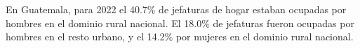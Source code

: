 En Guatemala, para 2022 el 40.7\% de jefaturas de hogar estaban ocupadas por hombres en el dominio rural nacional. El 18.0\% de jefaturas fueron ocupadas por hombres en el resto urbano, y el 14.2\% por mujeres en el dominio rural nacional. 